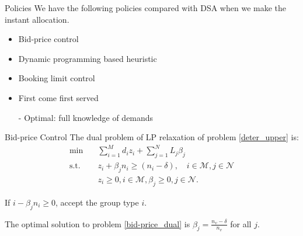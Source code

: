     \begin{frame}{Policies}
      We have the following policies compared with DSA when we make the instant allocation.
    
      \begin{itemize}
        \item Bid-price control
        \item Dynamic programming based heuristic
        \item Booking limit control
        \item First come first served
        \item[-] Optimal: full knowledge of demands
      \end{itemize}
    \end{frame}

      \begin{frame}{Bid-price Control}
        The dual problem of LP relaxation of problem \eqref{deter_upper} is:
        \begin{equation}\label{bid-price_dual}
          \begin{aligned}
          \min \quad & \sum_{i=1}^{M} d_i z_i + \sum_{j= 1}^{N} L_j \beta_{j} \\
          \text {s.t.} \quad & z_{i} + \beta_j n_i \geq (n_i-\delta), \quad i \in \mathcal{M}, j \in \mathcal{N} \\
          & z_{i} \geq 0, i \in \mathcal{M}, \beta_{j} \geq 0, j \in \mathcal{N}.
          \end{aligned}
        \end{equation}
        
        \small
        If $i - \beta_j n_i \geq 0$, accept the group type $i$. 

        The optimal solution to problem \eqref{bid-price_dual} is $\beta_j = \frac{n_v - \delta}{n_v}$ for all $j$.

      \end{frame}

